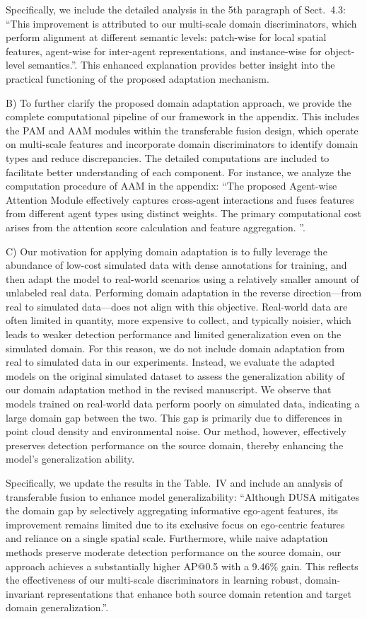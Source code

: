\documentclass[12pt,a4paper]{article}
\begin{document}
Specifically, we include the detailed analysis in the 5th paragraph of Sect.~4.3: ``This improvement is attributed to our multi-scale domain discriminators, which perform alignment at different semantic levels: patch-wise for local spatial features, agent-wise for inter-agent representations, and instance-wise for object-level semantics.''.
This enhanced explanation provides better insight into the practical functioning of the proposed adaptation mechanism. 


B) To further clarify the proposed domain adaptation approach, we provide the complete computational pipeline of our framework in the appendix. This includes the PAM and AAM modules within the transferable fusion design, which operate on multi-scale features and incorporate domain discriminators to identify domain types and reduce discrepancies. The detailed computations are included to facilitate better understanding of each component. For instance, we analyze the computation procedure of AAM in the appendix: ``The proposed Agent-wise Attention Module effectively captures cross-agent interactions and fuses features from different agent types using distinct weights. The primary computational cost arises from the attention score calculation and feature aggregation. ''.

C) Our motivation for applying domain adaptation is to fully leverage the abundance of low-cost simulated data with dense annotations for training, and then adapt the model to real-world scenarios using a relatively smaller amount of unlabeled real data. Performing domain adaptation in the reverse direction—from real to simulated data—does not align with this objective. Real-world data are often limited in quantity, more expensive to collect, and typically noisier, which leads to weaker detection performance and limited generalization even on the simulated domain. For this reason, we do not include domain adaptation from real to simulated data in our experiments. Instead, we evaluate the adapted models on the original simulated dataset to assess the generalization ability of our domain adaptation method in the revised manuscript.
We observe that models trained on real-world data perform poorly on simulated data, indicating a large domain gap between the two. This gap is primarily due to differences in point cloud density and environmental noise. Our method, however, effectively preserves detection performance on the source domain, thereby enhancing the model's generalization ability.

Specifically, we update the results in the Table.~IV and include an analysis of transferable fusion to enhance model generalizability: ``Although DUSA mitigates the domain gap by selectively aggregating informative ego-agent features, its improvement remains limited due to its exclusive focus on ego-centric features and reliance on a single spatial scale.
Furthermore, while naive adaptation methods preserve moderate detection performance on the source domain, our approach achieves a substantially higher AP@0.5 with a 9.46\% gain. This reflects the effectiveness of our multi-scale discriminators in learning robust, domain-invariant representations that enhance both source domain retention and target domain generalization.''.
\end{document}

